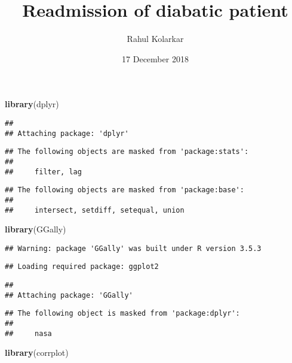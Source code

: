 \documentclass[]{article}
\title{Readmission of diabatic patient}
\author{Rahul Kolarkar}
\date{17 December 2018}
\newenvironment{Shaded}{\begin{snugshade}}{\end{snugshade}}
\newcommand{\KeywordTok}[1]{\textcolor[rgb]{0.13,0.29,0.53}{\textbf{#1}}}
\newcommand{\NormalTok}[1]{#1}
\begin{document}
\maketitle

\begin{Shaded}
\begin{Highlighting}[]
\KeywordTok{library}\NormalTok{(dplyr)}
\end{Highlighting}
\end{Shaded}

\begin{verbatim}
## 
## Attaching package: 'dplyr'
\end{verbatim}

\begin{verbatim}
## The following objects are masked from 'package:stats':
## 
##     filter, lag
\end{verbatim}

\begin{verbatim}
## The following objects are masked from 'package:base':
## 
##     intersect, setdiff, setequal, union
\end{verbatim}

\begin{Shaded}
\begin{Highlighting}[]
\KeywordTok{library}\NormalTok{(GGally)}
\end{Highlighting}
\end{Shaded}

\begin{verbatim}
## Warning: package 'GGally' was built under R version 3.5.3
\end{verbatim}

\begin{verbatim}
## Loading required package: ggplot2
\end{verbatim}

\begin{verbatim}
## 
## Attaching package: 'GGally'
\end{verbatim}

\begin{verbatim}
## The following object is masked from 'package:dplyr':
## 
##     nasa
\end{verbatim}

\begin{Shaded}
\begin{Highlighting}[]
\KeywordTok{library}\NormalTok{(corrplot)}
\end{Highlighting}
\end{Shaded}
\end{document}
